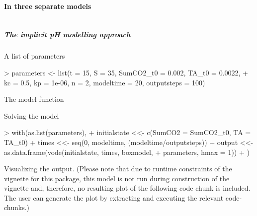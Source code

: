 \documentclass[article,nojss]{jss}
\begin{document}
\paragraph{In three separate models} $\;$\\


\subparagraph{The implicit pH modelling approach}$\,$\\
           
A list of parameters
\begin{scriptsize}
\begin{Schunk}
\begin{Sinput}
> parameters <- list(t = 15, S = 35, SumCO2_t0 = 0.002, TA_t0 = 0.0022, 
+     kc = 0.5, kp = 1e-06, n = 2, modeltime = 20, outputsteps = 100)
\end{Sinput}
\end{Schunk}
\end{scriptsize}

The model function
\begin{scriptsize}
\begin{Schunk}
\end{Schunk}
\end{scriptsize}


Solving the model
\begin{scriptsize}
\begin{Schunk}
\begin{Sinput}
> with(as.list(parameters), {
+     initialstate <<- c(SumCO2 = SumCO2_t0, TA = TA_t0)
+     times <<- seq(0, modeltime, (modeltime/outputsteps))
+     output <<- as.data.frame(vode(initialstate, times, boxmodel, 
+         parameters, hmax = 1))
+ })
\end{Sinput}
\end{Schunk}
\end{scriptsize}

Visualizing the output.
(Please note that due to runtime constraints of the vignette for this package, this model is not run during construction of the vignette 
and, therefore, no resulting plot of the following code chunk is included. The user can generate the plot by extracting and executing the relevant code-chunks.)
\end{document}
